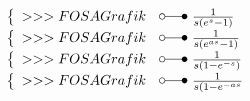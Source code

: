 \[\begin{array}{@{}l@{ ~ \laplace ~ }l@{}}
\left\lbrace\begin{array}{l}
>>>FOSA Grafik \\
\end{array}\right. &
    \frac{1}{s (e^s - 1)} \\
\left\lbrace\begin{array}{l}
>>>FOSA Grafik \\
\end{array}\right. &
    \frac{1}{s (e^{as} - 1)} \\
\left\lbrace\begin{array}{l}
>>>FOSA Grafik \\
\end{array}\right. &
    \frac{1}{s (1 - e^{-s})} \\
\left\lbrace\begin{array}{l}
>>>FOSA Grafik \\
\end{array}\right. &
    \frac{1}{s (1 - e^{-as}} \\

\end{array} \]

